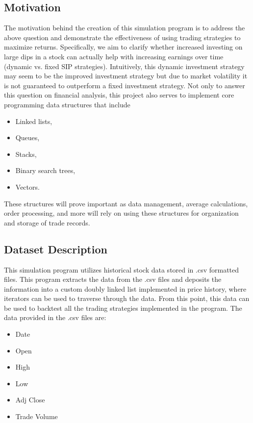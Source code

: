 \documentclass[12pt]{article}
\begin{document}
\subsection{Motivation}
The motivation behind the creation of this simulation program is to address the above question and demonstrate the effectiveness of using trading strategies to maximize returns. Specifically, we aim to clarify whether increased investing on large dips in a stock can actually help with increasing earnings over time (dynamic vs. fixed SIP strategies). Intuitively, this dynamic investment strategy may seem to be the improved investment strategy but due to market volatility it is not guaranteed to outperform a fixed investment strategy. 
Not only to answer this question on financial analysis, this project also serves to implement core programming data structures that include
\begin{itemize}
    \item Linked lists,
    \item Queues,
    \item Stacks,
    \item Binary search trees,
    \item Vectors.
\end{itemize}

These structures will prove important as data management, average calculations, order processing, and more will rely on using these structures for organization and storage of trade records. 

\subsection{Dataset Description}
This simulation program utilizes historical stock data stored in .csv formatted files. 
This program extracts the data from the .csv files and deposits the information into a custom doubly 
linked list implemented in price history, where iterators can be used to traverse through the data. 
From this point, this data can be used to backtest all the trading strategies implemented in the program. 
The data provided in the .csv files are:
\begin{itemize}
    \item Date
    \item Open
    \item High
    \item Low
    \item Adj Close
    \item Trade Volume
\end{itemize}
\end{document}
